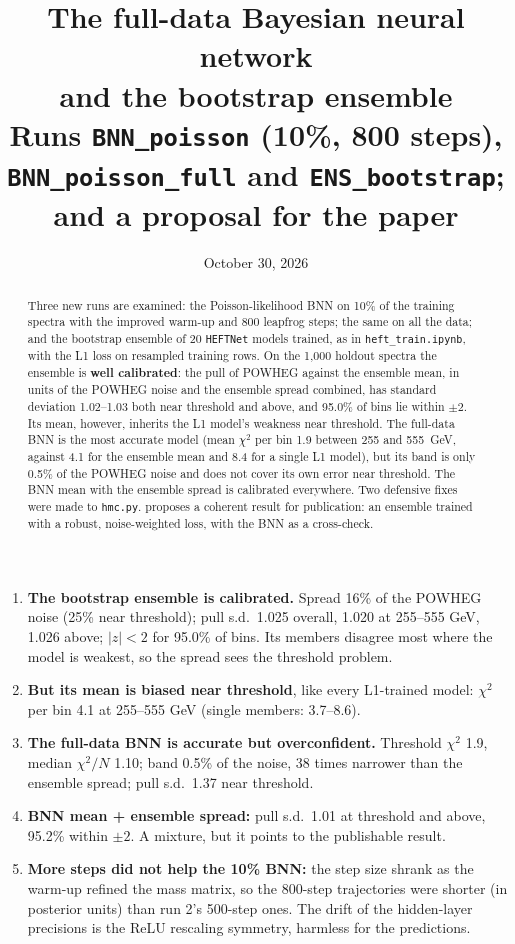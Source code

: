 \documentclass[11pt]{article}
\title{\textbf{The full-data Bayesian neural network\\ and the bootstrap ensemble}\\[4pt]
\large Runs \texttt{BNN\_poisson} (10\%, 800 steps), \texttt{BNN\_poisson\_full} and
\texttt{ENS\_bootstrap}; and a proposal for the paper}
\date{October 30, 2026}
\newcommand{\file}[1]{\nolinkurl{#1}}
\newcommand{\code}[1]{\texttt{#1}}
\begin{document}
\maketitle

\begin{abstract}
\noindent
Three new runs are examined: the Poisson-likelihood BNN on 10\% of the training spectra
with the improved warm-up and 800 leapfrog steps; the same on all the data; and the
bootstrap ensemble of 20 \code{HEFTNet} models trained, as in \file{heft_train.ipynb},
with the L1 loss on resampled training rows. On the 1,000 holdout spectra the ensemble is
\textbf{well calibrated}: the pull of POWHEG against the ensemble mean, in units of the
POWHEG noise and the ensemble spread combined, has standard deviation 1.02--1.03 both near
threshold and above, and 95.0\% of bins lie within $\pm 2$. Its mean, however, inherits the
L1 model's weakness near threshold. The full-data BNN is the most accurate model (mean
$\chi^2$ per bin 1.9 between 255 and 555~GeV, against 4.1 for the ensemble mean and 8.4 for
a single L1 model), but its band is only 0.5\% of the POWHEG noise and does not cover its
own error near threshold. The BNN mean with the ensemble spread is calibrated everywhere.
Two defensive fixes were made to \file{hmc.py}.  proposes a coherent
result for publication: an ensemble trained with a robust, noise-weighted loss, with the
BNN as a cross-check.
\end{abstract}

\begin{keyidea}
\begin{enumerate}
  \item \textbf{The bootstrap ensemble is calibrated.} Spread 16\% of the POWHEG noise
    (25\% near threshold); pull s.d.\ 1.025 overall, 1.020 at 255--555 GeV, 1.026 above;
    $|z| < 2$ for 95.0\% of bins. Its members disagree most where the model is weakest, so
    the spread sees the threshold problem.
  \item \textbf{But its mean is biased near threshold}, like every L1-trained model:
    $\chi^2$ per bin 4.1 at 255--555 GeV (single members: 3.7--8.6).
  \item \textbf{The full-data BNN is accurate but overconfident.} Threshold $\chi^2$ 1.9,
    median $\chi^2/N$ 1.10; band 0.5\% of the noise, 38 times narrower than the ensemble
    spread; pull s.d.\ 1.37 near threshold.
  \item \textbf{BNN mean + ensemble spread:} pull s.d.\ 1.01 at threshold and above,
    95.2\% within $\pm 2$. A mixture, but it points to the publishable result.
  \item \textbf{More steps did not help the 10\% BNN:} the step size shrank as the warm-up
    refined the mass matrix, so the 800-step trajectories were shorter (in posterior units)
    than run 2's 500-step ones. The drift of the hidden-layer precisions is the ReLU
    rescaling symmetry, harmless for the predictions.
\end{enumerate}
\end{keyidea}
\end{document}
